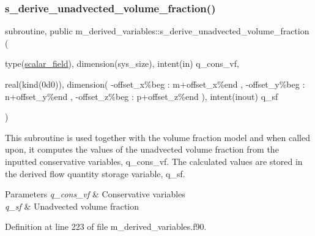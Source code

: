 \subsubsection{\texorpdfstring{s\+\_\+derive\+\_\+unadvected\+\_\+volume\+\_\+fraction()}{s\_derive\_unadvected\_volume\_fraction()}}
{\footnotesize\ttfamily subroutine, public m\+\_\+derived\+\_\+variables\+::s\+\_\+derive\+\_\+unadvected\+\_\+volume\+\_\+fraction (\begin{DoxyParamCaption}\item[{type(\hyperlink{structm__derived__types_1_1scalar__field}{scalar\+\_\+field}), dimension(sys\+\_\+size), intent(in)}]{q\+\_\+cons\+\_\+vf,  }\item[{real(kind(0d0)), dimension( -\/offset\+\_\+x\%beg \+: m+offset\+\_\+x\%end  ,                        -\/offset\+\_\+y\%beg \+: n+offset\+\_\+y\%end  ,                        -\/offset\+\_\+z\%beg \+: p+offset\+\_\+z\%end ), intent(inout)}]{q\+\_\+sf }\end{DoxyParamCaption})}



This subroutine is used together with the volume fraction model and when called upon, it computes the values of the unadvected volume fraction from the inputted conservative variables, q\+\_\+cons\+\_\+vf. The calculated values are stored in the derived flow quantity storage variable, q\+\_\+sf. 


\begin{DoxyParams}{Parameters}
{\em q\+\_\+cons\+\_\+vf} & Conservative variables \\
\hline
{\em q\+\_\+sf} & Unadvected volume fraction \\
\hline
\end{DoxyParams}


Definition at line 223 of file m\+\_\+derived\+\_\+variables.\+f90.

\mbox{\label{namespacem__derived__variables_aa038ec37a8a0c8fe8d7185b9ef6d54a9}} 
